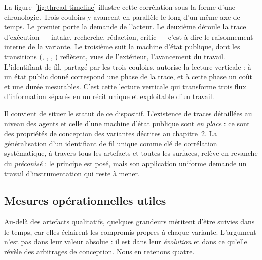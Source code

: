 La figure~\ref{fig:thread-timeline} illustre cette corrélation sous la
forme d'une chronologie. Trois couloirs y avancent en parallèle le
long d'un même axe de temps. Le premier porte la demande de l'acteur.
Le deuxième déroule la trace d'exécution — intake, recherche,
rédaction, critic — c'est-à-dire le raisonnement interne de la
variante. Le troisième suit la machine d'état publique, dont les
transitions (, , ,
) reflètent, vues de l'extérieur, l'avancement du
travail. L'identifiant de fil, partagé par les trois couloirs, autorise
la lecture verticale : à un état public donné correspond une phase de
la trace, et à cette phase un coût et une durée mesurables. C'est cette
lecture verticale qui transforme trois flux d'information séparés en un
récit unique et exploitable d'un travail.

Il convient de situer le statut de ce dispositif. L'existence de
traces détaillées au niveau des agents et celle d'une machine d'état
publique sont \emph{en place} : ce sont des propriétés de conception
des variantes décrites au chapitre~2. La généralisation d'un
identifiant de fil unique comme clé de corrélation systématique, à
travers tous les artefacts et toutes les surfaces, relève en revanche
du \emph{préconisé} : le principe est posé, mais son application
uniforme demande un travail d'instrumentation qui reste à mener.

\subsection{Mesures opérationnelles utiles}
\label{sec:metriques}

Au-delà des artefacts qualitatifs, quelques grandeurs méritent d'être
suivies dans le temps, car elles éclairent les compromis propres à
chaque variante. L'argument n'est pas dans leur valeur absolue : il est
dans leur \emph{évolution} et dans ce qu'elle révèle des arbitrages de
conception. Nous en retenons quatre.

